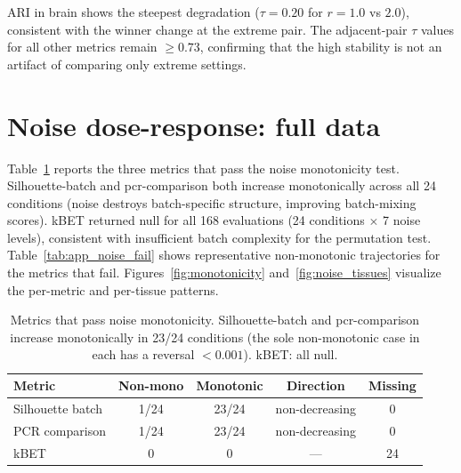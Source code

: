 \documentclass[10pt,letterpaper]{article}
\begin{document}
ARI in brain shows the steepest degradation ($\tau = 0.20$ for $r = 1.0$ vs $2.0$), consistent with the winner change at the extreme pair. The adjacent-pair $\tau$ values for all other metrics remain $\geq 0.73$, confirming that the high stability is not an artifact of comparing only extreme settings.


\section{Noise dose-response: full data}
\label{app:noise}

Table~\ref{tab:app_noise_pass} reports the three metrics that pass the noise monotonicity test. Silhouette-batch and pcr-comparison both increase monotonically across all 24 conditions (noise destroys batch-specific structure, improving batch-mixing scores). kBET returned null for all 168 evaluations (24 conditions $\times$ 7 noise levels), consistent with insufficient batch complexity for the permutation test. Table~\ref{tab:app_noise_fail} shows representative non-monotonic trajectories for the metrics that fail. Figures~\ref{fig:monotonicity} and~\ref{fig:noise_tissues} visualize the per-metric and per-tissue patterns.

\begin{table}[h!]
\centering
\caption{Metrics that pass noise monotonicity. Silhouette-batch and pcr-comparison increase monotonically in 23/24 conditions (the sole non-monotonic case in each has a reversal $< 0.001$). kBET: all null.}
\label{tab:app_noise_pass}
\small
\begin{tabular}{@{}lcccc@{}}
\toprule
Metric & Non-mono & Monotonic & Direction & Missing \\
\midrule
Silhouette batch & 1/24 & 23/24 & non-decreasing & 0 \\
PCR comparison   & 1/24 & 23/24 & non-decreasing & 0 \\
kBET             & 0    & 0     & ---            & 24 \\
\bottomrule
\end{tabular}
\end{table}
\end{document}
